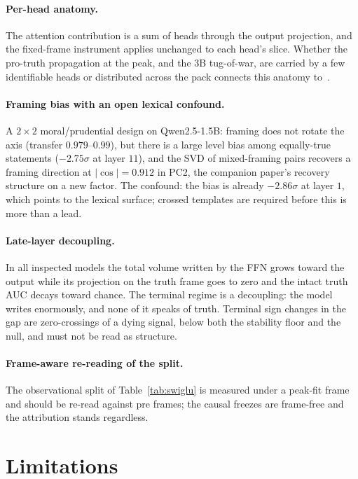 \documentclass[11pt]{article}
\begin{document}
\paragraph{Per-head anatomy.} The attention contribution is a sum of heads
through the output projection, and the fixed-frame instrument applies
unchanged to each head's slice. Whether the pro-truth propagation at the
peak, and the 3B tug-of-war, are carried by a few identifiable heads or
distributed across the pack connects this anatomy
to~\cite{headgenome}.

\paragraph{Framing bias with an open lexical confound.} A $2{\times}2$
moral/prudential design on Qwen2.5-1.5B: framing does not rotate the axis
(transfer $0.979$--$0.99$), but there is a large level bias among
equally-true statements ($-2.75\sigma$ at layer $11$), and the SVD of
mixed-framing pairs recovers a framing direction at $|\cos| = 0.912$ in
PC2, the companion paper's recovery structure on a new factor. The
confound: the bias is already $-2.86\sigma$ at layer $1$, which points to
the lexical surface; crossed templates are required before this is more
than a lead.

\paragraph{Late-layer decoupling.} In all inspected models the total
volume written by the FFN grows toward the output while its projection on
the truth frame goes to zero and the intact truth AUC decays toward
chance. The terminal regime is a decoupling: the model writes enormously,
and none of it speaks of truth. Terminal sign changes in the gap are
zero-crossings of a dying signal, below both the stability floor and the
null, and must not be read as structure.

\paragraph{Frame-aware re-reading of the split.} The observational split
of Table~\ref{tab:swiglu} is measured under a peak-fit frame and should be
re-read against pre frames; the causal freezes are frame-free and the
attribution stands regardless.

\section{Limitations}
\label{sec:limits}
\end{document}
